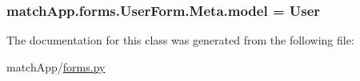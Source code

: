 \subsubsection[{model}]{\setlength{\rightskip}{0pt plus 5cm}match\+App.\+forms.\+User\+Form.\+Meta.\+model = User\hspace{0.3cm}{\ttfamily [static]}}\label{classmatch_app_1_1forms_1_1_user_form_1_1_meta_a5d9648ab073e418b0cfa6b4883c32423}


The documentation for this class was generated from the following file\+:\begin{DoxyCompactItemize}
\item 
match\+App/\hyperlink{forms_8py}{forms.\+py}\end{DoxyCompactItemize}
